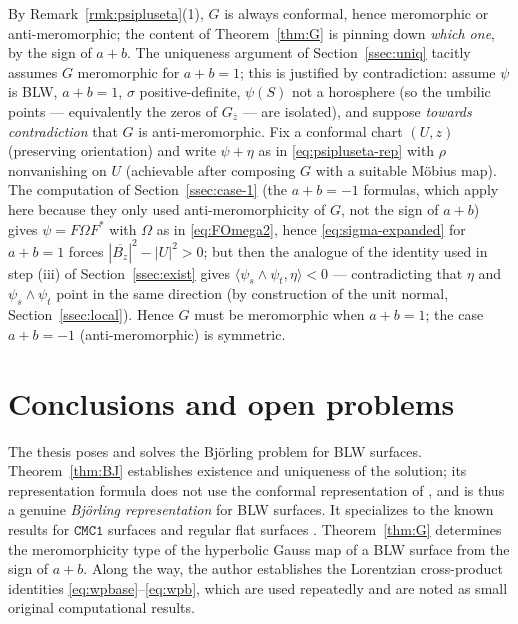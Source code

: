 \documentclass[11pt,a4paper]{article}
\newcommand{\ip}[2]{\langle #1,#2\rangle}            %
\theoremstyle{plain}
\theoremstyle{definition}
\theoremstyle{remark}
\begin{document}
By Remark~\ref{rmk:psipluseta}(1), $G$ is always conformal, hence
meromorphic or anti-meromorphic; the content of Theorem~\ref{thm:G} is
pinning down \emph{which one}, by the sign of $a+b$. The uniqueness
argument of Section~\ref{ssec:uniq} tacitly assumes $G$ meromorphic for
$a+b=1$; this is justified by contradiction: assume $\psi$ is BLW,
$a+b=1$, $\sigma$ positive-definite, $\psi(S)$ not a horosphere (so the
umbilic points — equivalently the zeros of $G_{\bar z}$ — are isolated),
and suppose \emph{towards contradiction} that $G$ is anti-meromorphic.
Fix a conformal chart $(U,z)$ (preserving orientation) and write
$\psi+\eta$ as in \eqref{eq:psipluseta-rep} with $\rho$ nonvanishing on
$U$ (achievable after composing $G$ with a suitable Möbius map). The
computation of Section~\ref{ssec:case-1} (the $a+b=-1$ formulas, which
apply here because they only used anti-meromorphicity of $G$, not the
sign of $a+b$) gives $\psi=F\Omega F^*$ with $\Omega$ as in
\eqref{eq:FOmega2}, hence \eqref{eq:sigma-expanded} for $a+b=1$ forces
$|\overline{B_z}|^2-|U|^2>0$; but then the analogue of the identity used in
step (iii) of Section~\ref{ssec:exist} gives
$\ip{\psi_s\wedge\psi_t}\eta<0$ — contradicting that $\eta$ and
$\psi_s\wedge\psi_t$ point in the same direction (by construction of the
unit normal, Section~\ref{ssec:local}). Hence $G$ must be meromorphic
when $a+b=1$; the case $a+b=-1$ (anti-meromorphic) is symmetric.

\section{Conclusions and open problems}\label{sec:conclusion}

The thesis poses and solves the Björling problem for BLW surfaces.
Theorem~\ref{thm:BJ} establishes existence and uniqueness of the solution;
its representation formula does not use the conformal representation of
\cite{GMM2}, and is thus a genuine \emph{Björling representation} for BLW
surfaces. It specializes to the known results for $\mathtt{CMC1}$ surfaces
\cite{GMM1} and regular flat surfaces \cite{GMM5}. Theorem~\ref{thm:G}
determines the meromorphicity type of the hyperbolic Gauss map of a BLW
surface from the sign of $a+b$. Along the way, the author establishes the
Lorentzian cross-product identities \eqref{eq:wpbase}--\eqref{eq:wpb},
which are used repeatedly and are noted as small original computational
results.
\end{document}

